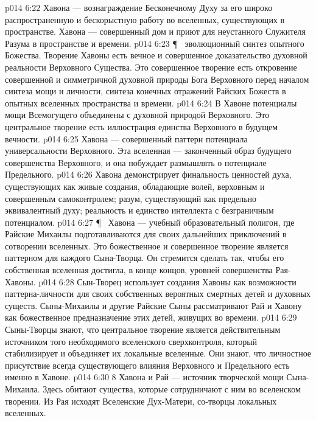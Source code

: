 \vs p014 6:22 Хавона --- вознаграждение Бесконечному Духу за его широко распространенную и бескорыстную работу во вселенных, существующих в пространстве. Хавона --- совершенный дом и приют для неустанного Служителя Разума в пространстве и времени.
\vs p014 6:23 \P\ \bibnobreakspace {} эволюционный синтез опытного Божества. Творение Хавоны есть вечное и совершенное доказательство духовной реальности Верховного Существа. Это совершенное творение есть откровение совершенной и симметричной духовной природы Бога Верховного перед началом синтеза мощи и личности, синтеза конечных отражений Райских Божеств в опытных вселенных пространства и времени.
\vs p014 6:24 В Хавоне потенциалы мощи Всемогущего объединены с духовной природой Верховного. Это центральное творение есть иллюстрация единства Верховного в будущем вечности.
\vs p014 6:25 Хавона --- совершенный паттерн потенциала универсальности Верховного. Эта вселенная --- законченный образ будущего совершенства Bерховного, и она побуждает размышлять о потенциале Предельного.
\vs p014 6:26 Хавона демонстрирует финальность ценностей духа, существующих как живые создания, обладающие волей, верховным и совершенным самоконтролем; разум, существующий как предельно эквивалентный духу; реальность и единство интеллекта с безграничным потенциалом.
\vs p014 6:27 \P\ \bibnobreakspace {} Хавона --- учебный образовательный полигон, где Райские Михаилы подготавливаются для своих дальнейших приключений в сотворении вселенных. Это божественное и совершенное творение является паттерном для каждого Сына\hyp{}Творца. Он стремится сделать так, чтобы его собственная вселенная достигла, в конце концов, уровней совершенства Рая\hyp{}Хавоны.
\vs p014 6:28 Сын\hyp{}Творец использует создания Хавоны как возможности паттерна\hyp{}личности для своих собственных вероятных смертных детей и духовных существ. Сыны\hyp{}Михаилы и другие Райские Сыны рассматривают Рай и Хавону как божественное предназначение этих детей, живущих во времени.
\vs p014 6:29 Сыны\hyp{}Творцы знают, что центральное творение является действительным источником того необходимого вселенского сверхконтроля, который стабилизирует и объединяет их локальные вселенные. Они знают, что личностное присутствие всегда существующего влияния Верховного и Предельного есть именно в Хавоне.
\vs p014 6:30 8 Хавона и Рай --- источник творческой мощи Сына\hyp{}Михаила. Здесь обитают существа, которые сотрудничают с ним во вселенском творении. Из Рая исходят Вселенские Дух\hyp{}Матери, со\hyp{}творцы локальных вселенных.
